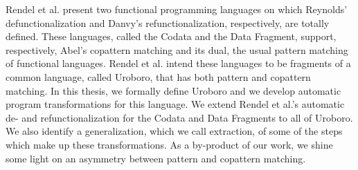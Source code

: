 % 
% 
%
Rendel et al. present two functional programming languages on which Reynolds' defunctionalization and Danvy's refunctionalization, respectively, are totally defined. These languages, called the Codata and the Data Fragment, support, respectively, Abel's copattern matching and its dual, the usual pattern matching of functional languages. Rendel et al. intend these languages to be fragments of a common language, called Uroboro, that has both pattern and copattern matching. In this thesis, we formally define Uroboro and we develop automatic program transformations for this language. We extend Rendel et al.'s automatic de- and refunctionalization for the Codata and Data Fragments to all of Uroboro. We also identify a generalization, which we call extraction, of some of the steps which make up these transformations. As a by-product of our work, we shine some light on an asymmetry between pattern and copattern matching.
